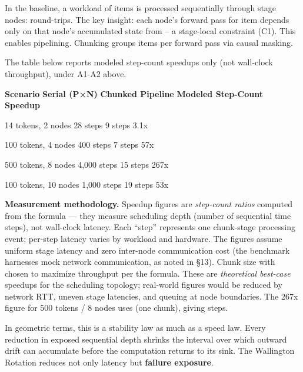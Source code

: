 \documentclass[
]{article}
\begin{document}
In the baseline, a workload of items is processed sequentially through
stage nodes: round-trips. The key insight: each node's forward pass for
item depends only on that node's accumulated state from -- a stage-local
constraint (C1). This enables pipelining. Chunking groups items per
forward pass via causal masking.

The table below reports modeled step-count speedups only (not wall-clock
throughput), under A1-A2 above.

\textbf{Scenario} \textbar{} \textbf{Serial (P×N)} \textbar{}
\textbf{Chunked Pipeline} \textbar{} \textbf{Modeled Step-Count Speedup}
\textbar{}

14 tokens, 2 nodes \textbar{} 28 steps \textbar{} 9 steps \textbar{}
3.1x \textbar{}

100 tokens, 4 nodes \textbar{} 400 steps \textbar{} 7 steps \textbar{}
57x \textbar{}

500 tokens, 8 nodes \textbar{} 4,000 steps \textbar{} 15 steps
\textbar{} 267x \textbar{}

100 tokens, 10 nodes \textbar{} 1,000 steps \textbar{} 19 steps
\textbar{} 53x \textbar{}

\textbf{Measurement methodology.} Speedup figures are \emph{step-count
ratios} computed from the formula --- they measure scheduling depth
(number of sequential time steps), not wall-clock latency. Each ``step''
represents one chunk-stage processing event; per-step latency varies by
workload and hardware. The figures assume uniform stage latency and zero
inter-node communication cost (the benchmark harnesses mock network
communication, as noted in §13). Chunk size with chosen to maximize
throughput per the formula. These are \emph{theoretical best-case}
speedups for the scheduling topology; real-world figures would be
reduced by network RTT, uneven stage latencies, and queuing at node
boundaries. The 267x figure for 500 tokens / 8 nodes uses (one chunk),
giving steps.

In geometric terms, this is a stability law as much as a speed law.
Every reduction in exposed sequential depth shrinks the interval over
which outward drift can accumulate before the computation returns to its
sink. The Wallington Rotation reduces not only latency but
\textbf{failure exposure}.
\end{document}
